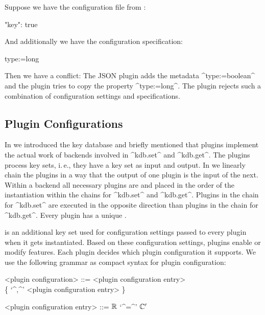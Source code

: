 \begin{example}
Suppose we have the configuration file from :

\begin{code}[language=CfgElektra]
{ "key": true }
\end{code}


And additionally we have the configuration specification:


\begin{code}
[key]
  type:=long
\end{code}


Then we have a conflict:
The JSON plugin adds the metadata ^type:=boolean^ and the plugin  tries to copy the property ^type:=long^.
The plugin  rejects such a combination of configuration settings and specifications.
\end{example}






\subsection{Plugin Configurations}
\label{sec:plugin-contract}

In  we introduced the key database and briefly mentioned that plugins implement the actual work of backends involved in ^kdb.set^ and ^kdb.get^.
The plugins process key sets, i.\,e., they have a key set as input and output.
In  we linearly chain the plugins in a way that the output of one plugin is the input of the next.
Within a backend all necessary plugins are  and placed in the order of the instantiation within the chains for ^kdb.set^ and ^kdb.get^.
Plugins in the chain for ^kdb.set^ are executed in the opposite direction than plugins in the chain for ^kdb.get^.
Every plugin has a unique .

 is an additional key set used for configuration settings passed to every plugin when it gets instantiated.
Based on these configuration settings, plugins enable or modify features.
Each plugin decides which plugin configuration it supports.
We use the following grammar as compact syntax for plugin configuration:


\begingroup %
\setlength{\grammarindent}{15em}
\begin{grammar}
<plugin configuration> ::= <plugin configuration entry> \\
                           \{ \lq^,^' <plugin configuration entry> \}

<plugin configuration entry> ::= $\mathbb{R}$ \lq^=^' $\mathbb{C}'$
\end{grammar}
\endgroup

